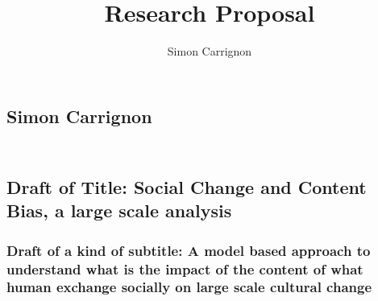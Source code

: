 \documentclass[a4paper]{article}
\title{Research Proposal}
\author{Simon Carrignon}
\begin{document}
\subsection*{Simon Carrignon}
\subsection*{\\ Draft of Title: Social Change and Content Bias, a large scale analysis}

\subsubsection*{Draft of a kind of subtitle: A model based approach to understand what is the impact of the content of what human exchange socially on large scale cultural change}
\end{document}
